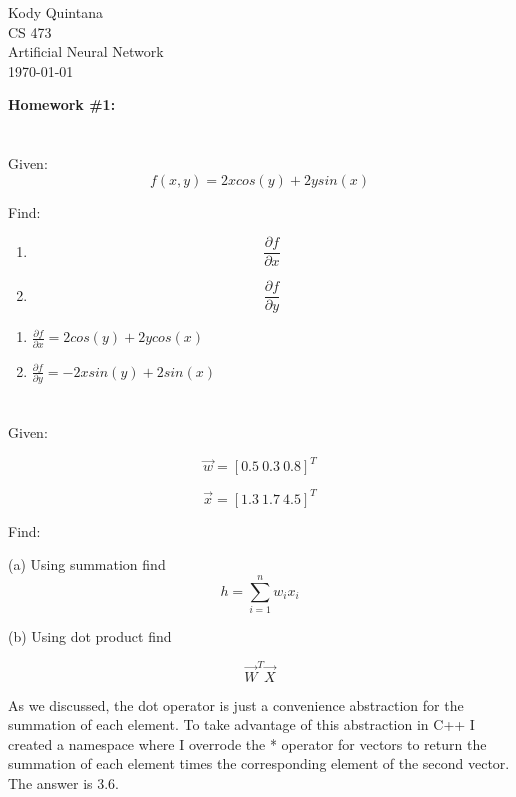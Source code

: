 \documentclass[14pt]{article}
\newcommand{\question}{\begin{tcolorbox}[boxrule=0.5pt, colback=backgrey, colframe=bordergrey, sharpish corners]\subsection{}}
\newcommand{\closequestion}{\end{tcolorbox}}
\begin{document}
\begin{flushleft}
 
\large
Kody Quintana\\
CS 473\\
Artificial Neural Network\\
\today\\
\boldmath

\begin{center}
\textbf{Homework \#1:}
\end{center}

\section{}
\question
Given:
$$
f(x,y) = 2x cos(y) + 2y sin(x)
$$

Find:

\begin{enumerate}[label=(\alph*)]
\item$$
\frac
	{\partial f}
	{\partial x}
$$

\item$$
\frac
	{\partial f}
	{\partial y}
$$
\end{enumerate}
\closequestion
\begin{enumerate}[label=(\alph*)]
\item$
\frac
	{\partial f}
	{\partial x}
= 2cos(y) + 2ycos(x)
$
\item$
\frac
	{\partial f}
	{\partial y}
= -2xsin(y) + 2sin(x)
$
\end{enumerate}

\section{}
\question
Given:

$$
\vec{w} = [0.5\ 0.3\ 0.8]^T
$$

$$
\vec{x} = [1.3\ 1.7\ 4.5]^T
$$

Find:

(a) Using summation find 
$$
h=\sum_{i=1}^{n} w_i x_i
$$

(b)
Using dot product find

$$
\vec{W}^T \vec{X}
$$
\closequestion

As we discussed, the dot operator is just a convenience abstraction for the summation of each element.
To take advantage of this abstraction in C++ I created a namespace where I overrode the * operator for vectors to return the summation of each element times the corresponding element of the second vector.
The answer is 3.6.


\end{flushleft}
\end{document}

